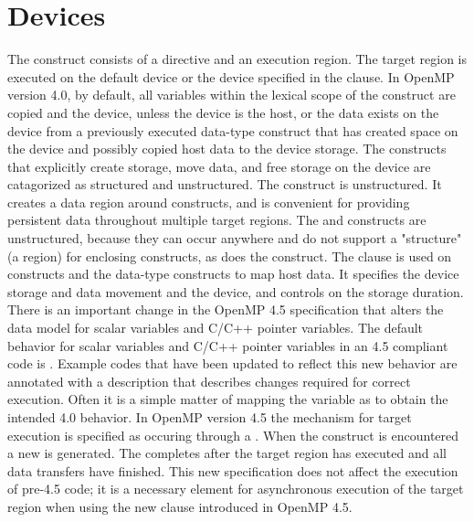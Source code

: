 \pagebreak
\chapter{Devices}
\label{chap:devices}

The  construct consists of a  directive 
and an execution region. The target region is executed on
the default device or the device specified in the  
clause. 
In OpenMP version 4.0, by default, all variables within the lexical
scope of the construct are copied  and  the
device, unless the device is the host, or the data exists on the
device from a previously executed data-type construct that
has created space on the device and possibly copied host
data to the device storage.
The constructs that explicitly
create storage, move data, and free storage on the device
are catagorized as structured and unstructured. The
 construct is unstructured. It creates
a data region around  constructs, and is
convenient for providing persistent data throughout multiple
target regions. The  and 
 constructs are unstructured, because 
they can occur anywhere and do not support a "structure" 
(a region) for enclosing  constructs, as does the
 construct. 
The  clause is used on  
constructs and the data-type constructs to map host data. It 
specifies the device storage and data movement  and 
the device, and controls on the storage duration.
There is an important change in the OpenMP 4.5 specification
that alters the data model for scalar variables and C/C++ pointer variables.
The default behavior for scalar variables and C/C++ pointer variables
in an 4.5 compliant code is . Example
codes that have been updated to reflect this new behavior are
annotated with a description that describes changes required
for correct execution. Often it is a simple matter of mapping
the variable as  to obtain the intended 4.0 behavior.
In OpenMP version 4.5 the mechanism for target
execution is specified as occuring through a . 
When the  construct is encountered a new 
 is generated. The  
completes after the target region has executed and all data 
transfers have finished.
This new specification does not affect the execution of 
pre-4.5 code; it is a necessary element for asynchronous 
execution of the target region when using the new  
clause introduced in OpenMP 4.5.
